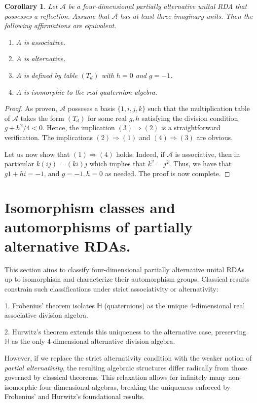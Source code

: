 \documentclass{amsart}
\theoremstyle{definition}
\theoremstyle{plain}
\newtheorem{corollary}{Corollary}
\begin{document}
\begin{corollary}

Let $\mathcal A$ be a four-dimensional partially alternative unital RDA  that possesses a reflection. Assume that $\mathcal A$ has at least three imaginary units.  Then the following affirmations are equivalent.
\begin{enumerate}
\item $A$ is associative.
\item $A$ is alternative.
\item $A$ is defined by table $(T_d)$ with $h=0$ and $g=-1$.
\item $A$ is isomorphic to the real quaternion algebra.
\end{enumerate}
\end{corollary}

\begin{proof}
As proven, $\mathcal A$ posseses a basis $\{1, i, j, k\}$ such that the multiplication table of $\mathcal A$ takes the form $(T_d)$ for some real $g, h$ satisfying the division condition $g+h^2/4 < 0$.
Hence, the implication $(3) \Rightarrow (2)$ is a straightforward verification. The implications $(2)\Rightarrow (1)$ and $(4)\Rightarrow (3)$ are obvious. 

Let us now show that $(1) \Rightarrow (4)$ holds. Indeed, if $\mathcal A$ is associative, then in particular $k(ij) = (ki) j$ which implies that $k^2 =j^2$. Thus, we have that $g1 + h i = -1$, and $g=-1, h=0$ as needed. The proof is now complete.
\end{proof}


\section{Isomorphism classes and automorphisms of partially alternative RDAs. }

This section aims to classify four-dimensional partially alternative unital RDAs up to isomorphism and characterize their automorphism groups. Classical results  constrain such classifications under strict associativity or alternativity:

1. Frobenius’ theorem isolates $\mathbb{H}$ (quaternions) as the unique 4-dimensional real associative division algebra.

2. Hurwitz’s theorem extends this uniqueness to the alternative case, preserving $\mathbb{H}$ as the only 4-dimensional alternative division algebra.

However, if we replace the strict alternativity condition with the weaker notion of \emph{partial alternativity}, the resulting algebraic structures differ radically from those governed by classical theorems. This relaxation allows for infinitely many non-isomorphic four-dimensional algebras, breaking the uniqueness enforced by Frobenius’ and Hurwitz’s foundational results.
\par\medskip
\end{document}
